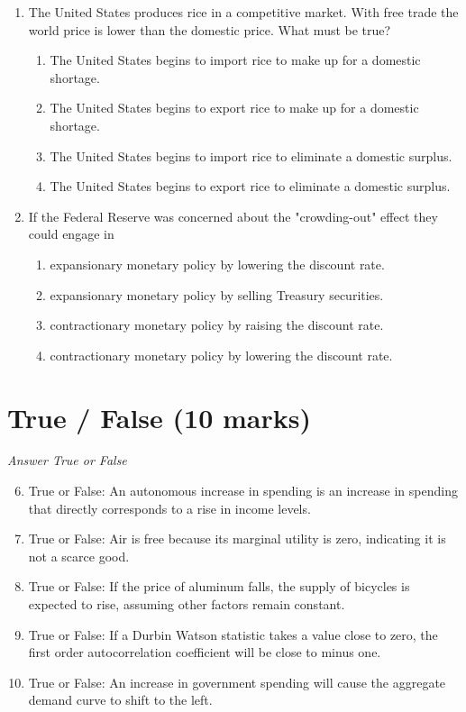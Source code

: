 \documentclass[12pt]{article}
\begin{document}
\begin{enumerate}[label=\arabic*.]
\begin{enumerate}[label=(\alph*)]
\end{enumerate}
\item The United States produces rice in a competitive market. With free trade the world price is lower than the domestic price. What must be true?
\begin{enumerate}[label=(\alph*)]
    \item The United States begins to import rice to make up for a domestic shortage.
    \item The United States begins to export rice to make up for a domestic shortage.
    \item The United States begins to import rice to eliminate a domestic surplus.
    \item The United States begins to export rice to eliminate a domestic surplus.
\end{enumerate}
\item If the Federal Reserve was concerned about the "crowding-out" effect they could engage in
\begin{enumerate}[label=(\alph*)]
    \item expansionary monetary policy by lowering the discount rate.
    \item expansionary monetary policy by selling Treasury securities.
    \item contractionary monetary policy by raising the discount rate.
    \item contractionary monetary policy by lowering the discount rate.
\end{enumerate}
\end{enumerate}

\section*{True / False (10 marks)}
\textit{Answer True or False}
\begin{enumerate}[label=\arabic*.]
\setcounter{enumi}{5}
\item True or False: An autonomous increase in spending is an increase in spending that directly corresponds to a rise in income levels.
\item True or False: Air is free because its marginal utility is zero, indicating it is not a scarce good.
\item True or False: If the price of aluminum falls, the supply of bicycles is expected to rise, assuming other factors remain constant.
\item True or False: If a Durbin Watson statistic takes a value close to zero, the first order autocorrelation coefficient will be close to minus one.
\item True or False: An increase in government spending will cause the aggregate demand curve to shift to the left.
\end{enumerate}
\end{document}
